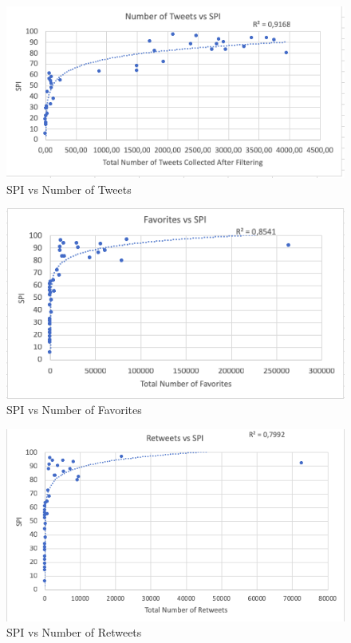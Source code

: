 \documentclass[12pt,conference]{IEEEtran}
\begin{document}
\begin{figure}[h!]
  \includegraphics[scale=0.5]{number.png}
  \caption{SPI vs Number of Tweets}
  \label{fig:birds}
\end{figure}

\begin{figure}[h!]
  \includegraphics[scale=0.5]{favs.png}
  \caption{SPI vs Number of Favorites}
  \label{fig:birds}
\end{figure}

\begin{figure}[h!]
  \includegraphics[scale=0.48]{rts.png}
  \caption{SPI vs Number of Retweets}
  \label{fig:birds}
\end{figure}
\end{document}
